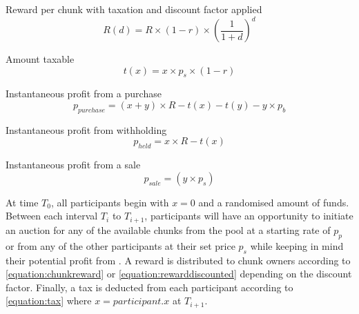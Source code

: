 \noindent Reward per chunk with taxation and discount factor applied
\begin{equation} \label{equation:rewarddiscounted}
    R(d) = R \times \left( 1 - r \right) \times \left( \frac{1}{1 + d} \right)^{d}
\end{equation}

\noindent Amount taxable
\begin{equation} \label{equation:tax}
    t(x) = x \times p_s \times (1 - r)
\end{equation}

\noindent Instantaneous profit from a purchase
\begin{equation} \label{equation:profitpurchase}
    p_{purchase} = (x + y) \times R - t(x) - t(y) - y \times p_b
\end{equation}

\noindent Instantaneous profit from withholding
\begin{equation} \label{equation:profitheld}
    p_{held} = x \times R - t(x)
\end{equation}

\noindent Instantaneous profit from a sale
\begin{equation} \label{equation:profitsale}
    p_{sale} = (y \times p_s)
\end{equation}

At time $T_0$, all participants begin with $x = 0$ and a randomised amount of funds. Between each interval $T_i$ to $T_{i + 1}$, participants will have an opportunity to initiate an auction for any of the available chunks from the pool at a starting rate of $p_p$ or from any of the other participants at their set price $p_s$ while keeping in mind their potential profit from . A reward is distributed to chunk owners according to \cref{equation:chunkreward} or \cref{equation:rewarddiscounted} depending on the discount factor. Finally, a tax is deducted from each participant according to \cref{equation:tax} where $x = participant.x$ at $T_{i + 1}$.
